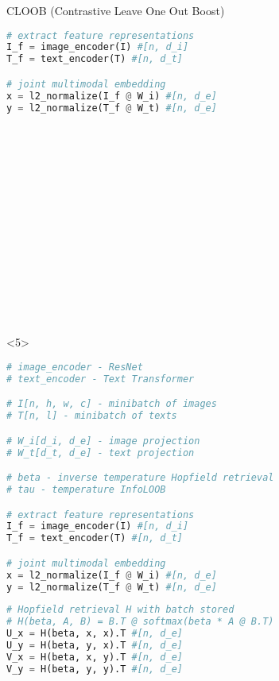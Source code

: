 \documentclass[utf8,aspectratio=169,ngerman,english,usenames,dvipsnames]{beamer}
\begin{document}
\begin{frame}[fragile]{CLOOB (Contrastive Leave One Out Boost)}
\begin{minipage}{0.8\textwidth}
\begin{onlyenv}
\begin{multicols}{2}
\begin{lstlisting}[language=Python, basicstyle=\tiny]
# extract feature representations
I_f = image_encoder(I) #[n, d_i]
T_f = text_encoder(T) #[n, d_t]

# joint multimodal embedding
x = l2_normalize(I_f @ W_i) #[n, d_e]
y = l2_normalize(T_f @ W_t) #[n, d_e]\end{lstlisting}
                \columnbreak
                \begin{lstlisting}[language=Python, basicstyle=\tiny, firstnumber=last]

















 \end{lstlisting}
            \end{multicols}
        \end{onlyenv}

        \begin{onlyenv}<5>
            \begin{multicols}{2}
                \begin{lstlisting}[language=Python, basicstyle=\tiny]
# image_encoder - ResNet
# text_encoder - Text Transformer

# I[n, h, w, c] - minibatch of images
# T[n, l] - minibatch of texts

# W_i[d_i, d_e] - image projection
# W_t[d_t, d_e] - text projection

# beta - inverse temperature Hopfield retrieval
# tau - temperature InfoLOOB

# extract feature representations
I_f = image_encoder(I) #[n, d_i]
T_f = text_encoder(T) #[n, d_t]

# joint multimodal embedding
x = l2_normalize(I_f @ W_i) #[n, d_e]
y = l2_normalize(T_f @ W_t) #[n, d_e]\end{lstlisting}
                \columnbreak
                \begin{lstlisting}[language=Python, basicstyle=\tiny, firstnumber=last]
# Hopfield retrieval H with batch stored
# H(beta, A, B) = B.T @ softmax(beta * A @ B.T)
U_x = H(beta, x, x).T #[n, d_e]
U_y = H(beta, y, x).T #[n, d_e]
V_x = H(beta, x, y).T #[n, d_e]
V_y = H(beta, y, y).T #[n, d_e]












\end{lstlisting}
\end{multicols}
\end{onlyenv}
\end{minipage}
\end{frame}
\end{document}
